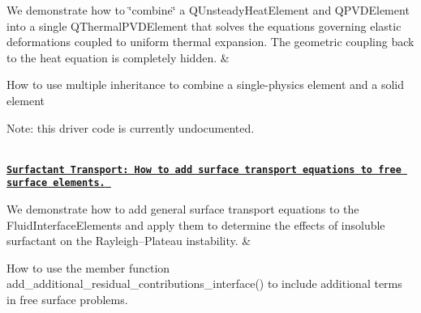 \begin{longtabu}
We demonstrate how to \char`\"{}combine\char`\"{} a {\ttfamily Q\+Unsteady\+Heat\+Element} and {\ttfamily Q\+P\+V\+D\+Element} into a single {\ttfamily Q\+Thermal\+P\+V\+D\+Element} that solves the equations governing elastic deformations coupled to uniform thermal expansion. The geometric coupling back to the heat equation is completely hidden.  &
\begin{DoxyItemize}
\item How to use multiple inheritance to combine a single-\/physics element and a solid element
\item Note\+: this driver code is currently undocumented.   
\end{DoxyItemize}\\
\label{_surfactant}%
 \href{../../multi_physics/rayleigh_instability_surfactant/html/index.html}{\tt {\bfseries  Surfactant Transport\+: How to add surface transport equations to free surface elements.} }

We demonstrate how to add general surface transport equations to the {\ttfamily Fluid\+Interface\+Elements} and apply them to determine the effects of insoluble surfactant on the Rayleigh--Plateau instability.  &
\begin{DoxyItemize}
\item How to use the member function {\ttfamily add\+\_\+additional\+\_\+residual\+\_\+contributions\+\_\+interface()} to include additional terms in free surface problems.  
\end{DoxyItemize}

\\
\end{longtabu}
\tabulinesep=1mm
